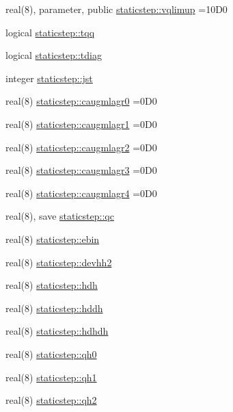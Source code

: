 \begin{DoxyCompactItemize}
\item 
real(8), parameter, public \hyperlink{namespacestaticstep_a2e05c48e66e07d84c7085d757222c663}{staticstep\+::vqlimup} =10\+D0
\item 
logical \hyperlink{namespacestaticstep_a97336d9d1daa4f79275cfd369eb7b8a4}{staticstep\+::tqq}
\item 
logical \hyperlink{namespacestaticstep_a3022db879b3a7ffd372a54b71707aca2}{staticstep\+::tdiag}
\item 
integer \hyperlink{namespacestaticstep_a9aa7dee4efe93fca07853f6989b2f045}{staticstep\+::jst}
\item 
real(8) \hyperlink{namespacestaticstep_a08feb669b9c0528696017b7ad3936faf}{staticstep\+::caugmlagr0} =0\+D0
\item 
real(8) \hyperlink{namespacestaticstep_a871b7997d43b6cf4041af2bff9fbec5c}{staticstep\+::caugmlagr1} =0\+D0
\item 
real(8) \hyperlink{namespacestaticstep_a814978f5b3d656fb78dc29ccf7d29190}{staticstep\+::caugmlagr2} =0\+D0
\item 
real(8) \hyperlink{namespacestaticstep_af93a45372644d111a6b47d25cfa22362}{staticstep\+::caugmlagr3} =0\+D0
\item 
real(8) \hyperlink{namespacestaticstep_a41e727f971f8eb424c2156762148abc3}{staticstep\+::caugmlagr4} =0\+D0
\item 
real(8), save \hyperlink{namespacestaticstep_ab1b2fd7b191b5100bb31d5b02df28d67}{staticstep\+::qc}
\item 
real(8) \hyperlink{namespacestaticstep_aee43c6b0cea94f1487aed360ca42fcb4}{staticstep\+::ebin}
\item 
real(8) \hyperlink{namespacestaticstep_a6be970f33ea95ee3b6c1553e88748961}{staticstep\+::devhh2}
\item 
real(8) \hyperlink{namespacestaticstep_a356065bb46b188687661cc58f93d058d}{staticstep\+::hdh}
\item 
real(8) \hyperlink{namespacestaticstep_a31efc0c841017e316500c37afcf7dc8a}{staticstep\+::hddh}
\item 
real(8) \hyperlink{namespacestaticstep_aa7f31f9f91a7710115dc3b41e204a17a}{staticstep\+::hdhdh}
\item 
real(8) \hyperlink{namespacestaticstep_a41743f17b5730664e6c770a4d4ea2110}{staticstep\+::qh0}
\item 
real(8) \hyperlink{namespacestaticstep_a91a6199d4eec95cff08b94738690894a}{staticstep\+::qh1}
\item 
real(8) \hyperlink{namespacestaticstep_a897519f2def07749c367f0380bdc452a}{staticstep\+::qh2}

\end{DoxyCompactItemize}
